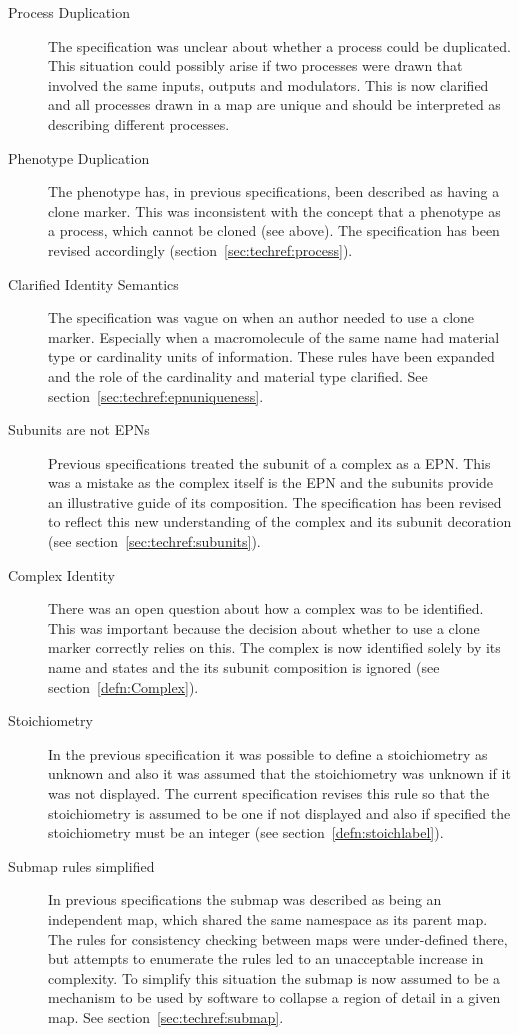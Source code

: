 \begin{description}
\item[Process Duplication] The specification was unclear about whether a process could be duplicated. This situation could possibly arise if two processes were drawn that involved the same inputs, outputs and modulators. This is now clarified and all processes drawn in a map are unique and should be interpreted as describing different processes.
\item[Phenotype Duplication] The phenotype has, in previous specifications, been described as having a clone marker. This was inconsistent with the concept that a phenotype as a process, which cannot be cloned (see above). The specification has been revised accordingly (section~\ref{sec:techref:process}).
\item[Clarified Identity Semantics] The specification was vague on when an author needed to use a clone marker. Especially when a macromolecule of the same name had material type or cardinality units of information. These rules have been expanded and the role of the cardinality and material type clarified. See section~\ref{sec:techref:epnuniqueness}.
\item[Subunits are not EPNs] Previous specifications treated the subunit of a complex as a EPN. This was a mistake as the complex itself is the EPN and the subunits provide an illustrative guide of its composition. The specification has been revised to reflect this new understanding of the complex and its subunit decoration (see section~\ref{sec:techref:subunits}).
\item[Complex Identity] There was an open question about how a complex was to be identified. This was important because the decision about whether to use a clone marker correctly relies on this. The complex is now identified solely by its name and states and the its subunit composition is ignored (see section~\ref{defn:Complex}).
\item[Stoichiometry] In the previous specification it was possible to define a stoichiometry as unknown and also it was assumed that the stoichiometry was unknown if it was not displayed. The current specification revises this rule so that the stoichiometry is assumed to be one if not displayed and also if specified the stoichiometry must be an integer (see section~\ref{defn:stoichlabel}).
\item[Submap rules simplified] In previous specifications the submap was described as being an independent map, which shared the same namespace as its parent map. The rules for consistency checking between maps were under-defined there, but attempts to enumerate the rules led to an unacceptable increase in complexity. To simplify this situation the submap is now assumed to be a mechanism to be used by software to collapse a region of detail in a given map.  See section~\ref{sec:techref:submap}.
\end{description}

